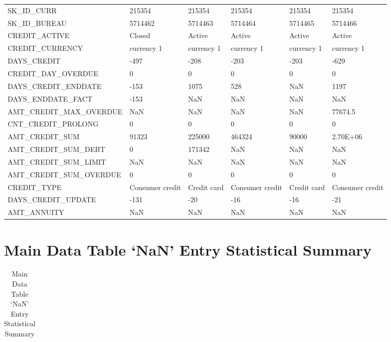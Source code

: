 \documentclass[12pt, letterpaper]{article}
\begin{document}
\begin{appendices}
{\begin{longtable}[c]{| l || p{2cm} | p{2cm} | p{2cm} | p{2cm} | p{2cm} |}
 \hline
 \endfoot

 \hline
 \endlastfoot

 SK_ID_CURR	&	215354	&	215354	&	215354	&	215354	&	215354	\\
SK_ID_BUREAU	&	5714462	&	5714463	&	5714464	&	5714465	&	5714466	\\
CREDIT_ACTIVE	&	Closed	&	Active	&	Active	&	Active	&	Active	\\
CREDIT_CURRENCY	&	currency 1	&	currency 1	&	currency 1	&	currency 1	&	currency 1	\\
DAYS_CREDIT	&	-497	&	-208	&	-203	&	-203	&	-629	\\
CREDIT_DAY_OVERDUE	&	0	&	0	&	0	&	0	&	0	\\
DAYS_CREDIT_ENDDATE	&	-153	&	1075	&	528	&	NaN	&	1197	\\
DAYS_ENDDATE_FACT	&	-153	&	NaN	&	NaN	&	NaN	&	NaN	\\
AMT_CREDIT_MAX_OVERDUE	&	NaN	&	NaN	&	NaN	&	NaN	&	77674.5	\\
CNT_CREDIT_PROLONG	&	0	&	0	&	0	&	0	&	0	\\
AMT_CREDIT_SUM	&	91323	&	225000	&	464324	&	90000	&	2.70E+06	\\
AMT_CREDIT_SUM_DEBT	&	0	&	171342	&	NaN	&	NaN	&	NaN	\\
AMT_CREDIT_SUM_LIMIT	&	NaN	&	NaN	&	NaN	&	NaN	&	NaN	\\
AMT_CREDIT_SUM_OVERDUE	&	0	&	0	&	0	&	0	&	0	\\
CREDIT_TYPE	&	Consumer credit	&	Credit card	&	Consumer credit	&	Credit card	&	Consumer credit	\\
DAYS_CREDIT_UPDATE	&	-131	&	-20	&	-16	&	-16	&	-21	\\
AMT_ANNUITY	&	NaN	&	NaN	&	NaN	&	NaN	&	NaN	\\
\end{longtable}
}
\normalsize

\section{Main Data Table `NaN' Entry Statistical Summary}
\label{appendix:maindatatablenanstatsummary}

\tiny
{}
{
\begin{longtable}[c]{| l || Rm{1.3cm} | Rm{1.3cm} | Rm{1.3cm} | Rm{1.3cm} | Rm{1.3cm} | Rm{1.3cm} | Rm{1.3cm} |}

 \caption{Main Data Table `NaN' Entry Statistical Summary\label{maindatatablenanstatsummary}}\\


\end{longtable}}
\end{appendices}
\end{document}
